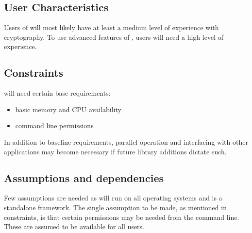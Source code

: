 
\subsection{User Characteristics}

Users of \cry{} will most likely have at least a medium
level of experience with cryptography. To use advanced
features of \cry, users will need a high level of \cryptos{}
experience.


\subsection{Constraints}

\cry{} will need certain base requirements:
\begin{itemize}
  \item basic memory and CPU availability
  \item command line permissions
\end{itemize}

In addition to baseline requirements, parallel operation and
interfacing with other applications may become necessary if
future library additions dictate such.


\subsection{Assumptions and dependencies}

Few assumptions are needed as \cry{} will run on all
operating systems and is a standalone framework. The single
assumption to be made, as mentioned in constraints, is that
certain permissions may be needed from the command line.
These are assumed to be available for all users.

